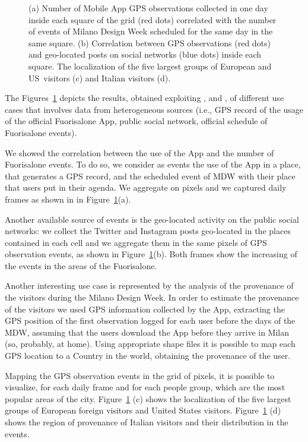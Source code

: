 \begin{figure}[p]
{}
\caption{(a) Number of Mobile App GPS observations collected in one day inside each square
of the grid (red dots) correlated with the number of events of Milano Design
Week scheduled for the same day in the same square. (b)  Correlation between GPS observations (red dots) and geo-located posts on social networks (blue dots) inside each square. The localization of the five largest groups of European and US\ visitors (c)  and Italian visitors (d).}
\label{fig:gps_geo}
\end{figure}

The Figures~\ref{fig:gps_geo} depicts the results, obtained exploiting \frappe{}, \sti{} and \sparkdi{}, of different use cases that involves data from heterogeneous sources (i.e., GPS record of the usage of the official Fuorisalone App, public social network, official schedule of Fuorisalone events).

We showed the correlation between the use of the App and the number of Fuorisalone events. To do so, we consider as \textsf{event}s the use of the App in a \textsf{place}, that generates a GPS record, and the scheduled \textsf{event} of MDW with their \textsf{place} that users put in their agenda. We aggregate on \textsf{pixel}s and we captured daily \textsf{frame}s as shown in in Figure~\ref{fig:gps_geo}(a).

Another available source of \textsf{event}s is the geo-located activity on the public social networks: we collect the Twitter and Instagram posts geo-located in the \textsf{place}s contained in each \textsf{cell} and we aggregate them in the same \textsf{pixel}s of GPS observation \textsf{event}s, as shown in Figure~\ref{fig:gps_geo}(b).
Both \textsf{frame}s show the increasing of the \textsf{event}s in the areas of the Fuorisalone.

Another interesting use case is represented by the analysis of the provenance of the visitors during the Milano Design Week.
In order to estimate the provenance of the visitors we used GPS information collected by the App, extracting the GPS position of the first observation logged for each user before the days of the MDW, assuming that the users download the App before they arrive in Milan (so, probably, at home). Using appropriate shape files it is possible to map each GPS location to a Country in the world, obtaining the provenance of the user.

Mapping the GPS observation \textsf{event}s in the \textsf{grid} of \textsf{pixel}s, it is possible to visualize, for each daily \textsf{frame} and for each people group, which are the most popular areas of the city. Figure~\ref{fig:gps_geo} (c) shows the localization of the five largest groups of European foreign visitors and United States visitors. Figure~\ref{fig:gps_geo} (d) shows the region of provenance of Italian visitors and their distribution in the events.

